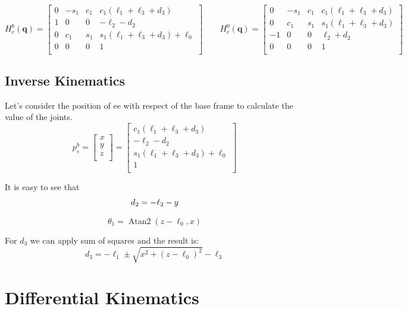 \documentclass[a4paper,12pt]{article}
\renewcommand*{\t}{\theta}
\renewcommand*{\l}{\ell}
\newcommand*{\q}{\bm{q}}
\begin{document}
\[
H^b_e(\q) = \begin{bmatrix}
    0    &  - s_1 & c_1 & c_1(\l_1+\l_3+d_3)\\
    1   & 0      &  0  &  -\l_2 - d_2 \\
    0    & c_{1} & s_1 & s_1(\l_1+\l_3+d_3) + \l_0 \\
    0    &     0  & 0   &        1       \\
\end{bmatrix}
\qquad
H^0_e(\q) = \begin{bmatrix}
    0    &  - s_1 & c_1 & c_1(\l_1+\l_3+d_3)\\
    0    & c_{1} & s_1 & s_1(\l_1+\l_3+d_3)\\
    -1   & 0      &  0  &  \l_2 + d_2 \\
    0    &     0  & 0   &        1       \\
\end{bmatrix}
\]

\subsection{Inverse Kinematics}
Let's consider the position of ee with respect of the base frame to calculate the value of the joints.
\[
p^b_e = \begin{bmatrix}
    x \\ y \\ z \\
\end{bmatrix}
=
\begin{bmatrix}
    c_1(\l_1+\l_3+d_3)\\
     -\l_2 - d_2 \\
    s_1(\l_1+\l_3+d_3) + \l_0 \\
    1        \\
\end{bmatrix}
\]

It is easy to see that
\[
d_2 = - \l_2 - y \\
\]

\[
\t_1 = \mathop{Atan2}(z-\l_0, x)
\]


For $d_3$ we can apply sum of squares and the result is:
\[
  d_3 = -\l_1 \pm \sqrt{x^2+(z-\l_0)^2} - \l_3  
\]

\section{Differential Kinematics}
\end{document}
